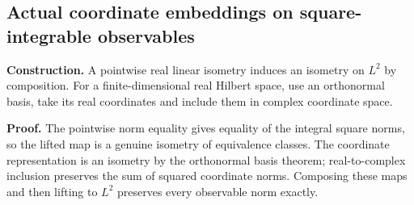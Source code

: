\documentclass[11pt,a4paper]{report}
\begin{document}
\subsection{\texorpdfstring{Actual coordinate embeddings on square-integrable observables}{Actual coordinate embeddings on square-integrable observables}}
\label{report-step-WassersteinMixing-ComplexRealCorrector-lean-4}


\textbf{Construction.} A pointwise real linear isometry induces an isometry on \(L^2\) by composition. For a finite-dimensional real Hilbert space, use an orthonormal basis, take its real coordinates and include them in complex coordinate space.



\textbf{Proof.} The pointwise norm equality gives equality of the integral square norms, so the lifted map is a genuine isometry of equivalence classes. The coordinate representation is an isometry by the orthonormal basis theorem; real-to-complex inclusion preserves the sum of squared coordinate norms. Composing these maps and then lifting to \(L^2\) preserves every observable norm exactly.
\end{document}
